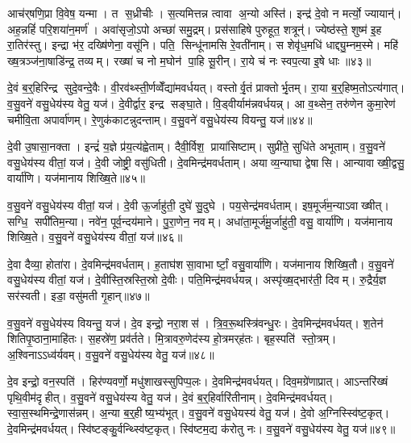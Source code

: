 आच॑र्‌षणि॒प्रा वि॒वेष॒ यन्मा। त स॒ध्रीचीः। स॒त्यमित्तन्न त्वावा अ॒न्यो अस्ति॑। इन्द्र॑ दे॒वो न मर्त्यो॒ ज्यायान्॑। अह॒न्नहिं॑ परि॒शया॑न॒मर्ण॑। अवा॑सृजो॒ऽपो अच्छा॑ समु॒द्रम्। प्रस॑साहिषे पुरुहूत॒ शत्रून्॑। ज्येष्ठ॑स्ते॒ शुष्म॑ इ॒ह रा॒तिर॑स्तु। इन्द्रा भ॑र॒ दख्षि॑णेना॒ वसू॑नि। पति॒ सिन्धू॑नामसि रे॒वती॑नाम्। स शेवृ॑ध॒मधि॑ धाद्द्यु॒म्नम॒स्मे। महि॑ ख्ष॒त्रञ्ज॑ना॒षाडि॑न्द्र॒ तव्यम्। रख्षा॑ च नो म॒घोन॑ पा॒हि सू॒रीन्। रा॒ये च॑ नः स्वप॒त्या इ॒षे धाः॥४३॥\anuvakamend[रे॒वती॑नाञ्च॒त्वारि॑ च]

दे॒वं ब॒र्॒हिरिन्द्र सुदे॒वन्दे॒वैः। वी॒रव॑थ्स्ती॒र्णव्वेँद्या॑मवर्धयत्। वस्तोर्वृ॒तं प्राक्तोर्भृ॒तम्। रा॒या ब॒र्॒हिष्म॒तोऽत्य॑गात्। व॒सु॒वने॑ वसु॒धेय॑स्य वेतु॒ यज॑। दे॒वीर्द्वार॒ इन्द्र सङ्घा॒ते। वि॒ड्वीर्याम॑न्नवर्धयन्न्। आ व॒थ्सेन॒ तरु॑णेन कुमा॒रेण॑ चमीवि॒ता अपार्वा॑णम्। रे॒णुक॑काटन्नुदन्ताम्। व॒सु॒वने॑ वसु॒धेय॑स्य वियन्तु॒ यज॑॥४४॥

दे॒वी उ॒षासा॒नक्ता। इन्द्रं॑ य॒ज्ञे प्र॑य॒त्य॑ह्वेताम्। दैवी॒र्विश॒ प्राया॑सिष्टाम्। सुप्री॑ते॒ सुधि॑ते अभूताम्। व॒सु॒वने॑ वसु॒धेय॑स्य वीतां॒ यज॑। दे॒वी जोष्ट्री॒ वसु॑धिती। दे॒वमिन्द्र॑मवर्धताम्। अयाव्य॒न्याघा द्वेषासि। आन्यावाख्षी॒द्वसु॒ वार्या॑णि। यज॑मानाय शिख्षि॒ते॥४५॥

व॒सु॒वने॑ वसु॒धेय॑स्य वीतां॒ यज॑। दे॒वी ऊ॒र्जाहु॑ती॒ दुघे॑ सु॒दुघे। पय॒सेन्द्र॑मवर्धताम्। इष॒मूर्ज॑म॒न्याऽवाख्षीत्। सग्धि॒ सपी॑तिम॒न्या। नवे॑न॒ पूर्व॒न्दय॑माने। पु॒रा॒णेन॒ नवम्। अधा॑ता॒मूर्ज॑मू॒र्जाहु॑ती॒ वसु॒ वार्या॑णि। यज॑मानाय शिख्षि॒ते। व॒सु॒वने॑ वसु॒धेय॑स्य वीतां॒ यज॑॥४६॥

दे॒वा दैव्या॒ होता॑रा। दे॒वमिन्द्र॑मवर्धताम्। ह॒ताघ॑शसा॒वाभार्ष्टां॒ वसु॒वार्या॑णि। यज॑मानाय शिख्षि॒तौ। व॒सु॒वने॑ वसु॒धेय॑स्य वीतां॒ यज॑। दे॒वीस्ति॒स्रस्ति॒स्रो दे॒वीः। पति॒मिन्द्र॑मवर्धयन्न्। अस्पृ॑ख्ष॒द्भार॑ती॒ दिवम्। रु॒द्रैर्य॒ज्ञ सर॑स्वती। इडा॒ वसु॑मती गृ॒हान्॥४७॥

व॒सु॒वने॑ वसु॒धेय॑स्य वियन्तु॒ यज॑। दे॒व इन्द्रो॒ नरा॒शस॑। त्रि॒व॒रू॒थस्त्रि॑वन्धु॒रः। दे॒वमिन्द्र॑मवर्धयत्। श॒तेन॑ शितिपृ॒ष्ठाना॒माहि॑तः। स॒हस्रे॑ण॒ प्रव॑र्तते। मि॒त्रावरु॒णेद॑स्य हो॒त्रमर्‌ह॑तः। बृह॒स्पति॑ स्तो॒त्रम्। अ॒श्विनाऽऽध्व॑र्यवम्। व॒सु॒वने॑ वसु॒धेय॑स्य वेतु॒ यज॑॥४८॥

दे॒व इन्द्रो॒ वन॒स्पति॑। हिर॑ण्यवर्णो॒ मधु॑शाखस्सुपिप्प॒लः। दे॒वमिन्द्र॑मवर्धयत्। दिव॒मग्रे॑णाप्रात्। आऽन्तरि॑ख्षं पृथि॒वीम॑दृहीत्। व॒सु॒वने॑ वसु॒धेय॑स्य वेतु॒ यज॑। दे॒वं ब॒र्॒हिर्वारि॑तीनाम्। दे॒वमिन्द्र॑मवर्धयत्। स्वा॒स॒स्थमिन्द्रे॒णास॑न्नम्। अ॒न्या ब॒र्॒हीष्य॒भ्य॑भूत्। व॒सु॒वने॑ वसु॒धेयस्य॑ वेतु॒ यज॑। दे॒वो अ॒ग्निस्स्वि॑ष्ट॒कृत्। दे॒वमिन्द्र॑मवर्धयत्। स्वि॑ष्टङ्कु॒र्वन्थ्स्वि॑ष्ट॒कृत्। स्वि॑ष्टम॒द्य क॑रोतु नः। व॒सु॒वने॑ वसु॒धेय॑स्य वेतु॒ यज॑॥४९॥

